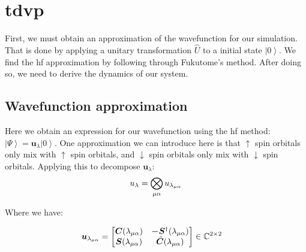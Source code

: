 \documentclass{aux/ttuthes2007}
\newcommand{\ket}[1]{\ensuremath{\left|#1\right\rangle}}
\newcommand{\uo}[1]{
		\IfEqCase{#1}{
			{0}{\mu}
			{1}{\nu}
			{2}{\xi}
		}[\PackageError{uo}{Undefined option to uo: #1}{}]
}
\newcommand{\oo}[1]{
		\IfEqCase{#1}{
			{0}{\alpha}
			{1}{\beta}
			{2}{\gamma}
		}[\PackageError{unocorb}{Undefined option to unuo: #1}{}]
}
\begin{document}
\section{\textbf{\gls{tdvp}}}\label{sec:tdvp}
First, we must obtain an approximation of the wavefunction for our simulation. That is done by applying a unitary transformation $\hat U$ to a initial state $\ket 0$.
We find the \gls {hf} approximation by following through Fukutome's method\cite{fukutome}. After doing so, we need to derive the dynamics of our system.

\subsection{\textbf{Wavefunction approximation}}

Here we obtain an expression for our wavefunction using the \gls{hf} method: $\ket\Psi = \bm u_\lambda \ket 0$.
One approximation we can introduce here is that $\uparrow$ spin orbitals only mix with $\uparrow$ spin orbitals, and
$\downarrow$ spin orbitals only mix with $\downarrow$ spin orbitals.
Applying this to decompose $\bm u_\lambda$:
\begin{equation}
	\begin{split}
	\label {eq:udecomposition}
	u_\lambda
	= \bigotimes_{\uo 0 \oo 0} u_{\lambda_{\uo 0 \oo 0}}
	\end{split}
\end{equation}

Where we have:

\begin{align*}
	\bm u_{\lambda_{\uo 0 \oo 0}} 
	&= \begin{bmatrix}\bm C(\lambda_{\uo 0 \oo 0}) & \bm -\bm S^\dagger(\lambda_{\uo 0 \oo 0}) \\ \bm S(\lambda_{\uo 0 \oo 0}) & \tilde {\bm C}(\lambda_{\uo 0 \oo 0})\end{bmatrix} \in \mathbb{\bm C}^{2\times 2}
\end{align*}
\end{document}
